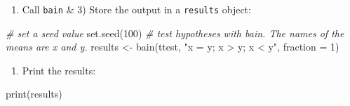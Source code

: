 \documentclass[
]{book}
\newenvironment{Shaded}{\begin{snugshade}}{\end{snugshade}}
\newcommand{\AttributeTok}[1]{\textcolor[rgb]{0.77,0.63,0.00}{#1}}
\newcommand{\CommentTok}[1]{\textcolor[rgb]{0.56,0.35,0.01}{\textit{#1}}}
\newcommand{\ConstantTok}[1]{\textcolor[rgb]{0.00,0.00,0.00}{#1}}
\newcommand{\DecValTok}[1]{\textcolor[rgb]{0.00,0.00,0.81}{#1}}
\newcommand{\FunctionTok}[1]{\textcolor[rgb]{0.00,0.00,0.00}{#1}}
\newcommand{\NormalTok}[1]{#1}
\newcommand{\OtherTok}[1]{\textcolor[rgb]{0.56,0.35,0.01}{#1}}
\newcommand{\SpecialCharTok}[1]{\textcolor[rgb]{0.00,0.00,0.00}{#1}}
\newcommand{\StringTok}[1]{\textcolor[rgb]{0.31,0.60,0.02}{#1}}
\providecommand{\tightlist}{%
  \setlength{\itemsep}{0pt}\setlength{\parskip}{0pt}}
\begin{document}
\begin{Shaded}
\end{Shaded}

\begin{enumerate}
\def\labelenumi{\arabic{enumi})}
\setcounter{enumi}{1}
\tightlist
\item
  Call \texttt{bain} \& 3) Store the output in a \texttt{results} object:
\end{enumerate}

\begin{Shaded}
\begin{Highlighting}[]
\CommentTok{\# set a seed value}
\FunctionTok{set.seed}\NormalTok{(}\DecValTok{100}\NormalTok{)}
\CommentTok{\# test hypotheses with bain. The names of the means are x and y.}
\NormalTok{results }\OtherTok{\textless{}{-}} \FunctionTok{bain}\NormalTok{(ttest, }\StringTok{"x = y; x \textgreater{} y; x \textless{} y"}\NormalTok{, }\AttributeTok{fraction =} \DecValTok{1}\NormalTok{)}
\end{Highlighting}
\end{Shaded}

\begin{enumerate}
\def\labelenumi{\arabic{enumi})}
\setcounter{enumi}{2}
\tightlist
\item
  Print the results:
\end{enumerate}

\begin{Shaded}
\begin{Highlighting}[]
\FunctionTok{print}\NormalTok{(results)}
\end{Highlighting}
\end{Shaded}
\end{document}
